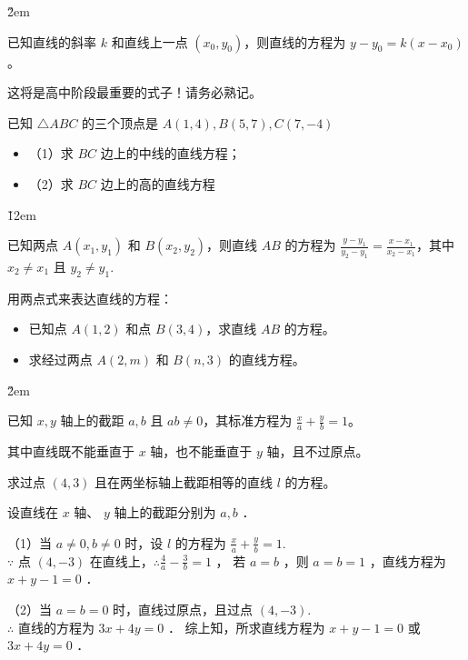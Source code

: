 \v{2em}

\begin{definition}[点斜式]
    已知直线的斜率 $k$ 和直线上一点 $(x_0, y_0)$，则直线的方程为 $y - y_0 = k(x - x_0)$。
\end{definition}

\begin{warning}
    这将是高中阶段最重要的式子！请务必熟记。
\end{warning}

\begin{example}
    已知 $\triangle A B C$ 的三个顶点是 $A(1,4), B(5,7), C(7,-4)$
    \begin{itemize}
        \item （1）求 $B C$ 边上的中线的直线方程；
        \item （2）求 $B C$ 边上的高的直线方程
    \end{itemize}
\end{example}

\v{12em}

\begin{definition}[两点式]
    已知两点 $A(x_1, y_1)$ 和 $B(x_2, y_2)$，则直线 $AB$ 的方程为 $\frac{y-y_1}{y_2-y_1} = \frac{x-x_1}{x_2-x_1}$，其中 $x_2 \neq x_1$ 且 $y_2 \neq y_1$.
\end{definition}

\begin{example}
    用两点式来表达直线的方程：
    \begin{itemize}
        \item 已知点 $A(1,2)$ 和点 $B(3,4)$，求直线 $AB$ 的方程。
        \item 求经过两点 $A(2,m)$ 和 $B(n,3)$ 的直线方程。
    \end{itemize}
\end{example}

\v{2em}

\begin{definition}[截距式]
    已知 $x, y$ 轴上的截距 $a, b$ 且 $ab \neq 0$，其标准方程为 $\frac{x}{a} + \frac{y}{b} = 1$。

    其中直线既不能垂直于 $x$ 轴，也不能垂直于 $y$ 轴，且不过原点。
\end{definition}

\begin{example}
    求过点 $(4,3)$ 且在两坐标轴上截距相等的直线 $l$ 的方程。
\end{example}

\begin{solution}
    设直线在 $x$ 轴、 $y$ 轴上的截距分别为 $a, b$ ．

    （1）当 $a \neq 0, b \neq 0$ 时，设 $l$ 的方程为 $\frac{x}{a}+\frac{y}{b}=1$. \\
    $\because$ 点 $(4,-3)$ 在直线上，$\therefore \frac{4}{a}-\frac{3}{b}=1$ ，
    若 $a=b$ ，则 $a=b=1$ ，直线方程为 $x+y-1=0$ ．

    （2）当 $a=b=0$ 时，直线过原点，且过点 $(4,-3)$. \\
    $\therefore$ 直线的方程为 $3 x+4 y=0$ ．
    综上知，所求直线方程为 $x+y-1=0$ 或 $3 x+4 y=0$ ．
\end{solution}

